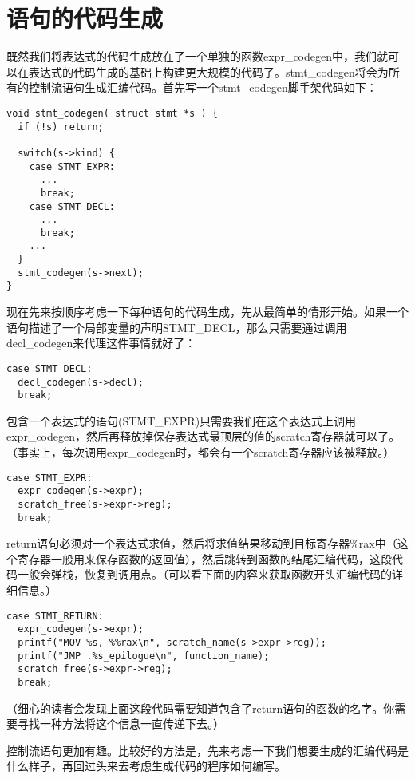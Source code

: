 \documentclass[cn,11pt,chinese]{elegantbook}
\begin{document}
\section{语句的代码生成}

既然我们将表达式的代码生成放在了一个单独的函数expr\_codegen中，我们就可以在表达式的代码生成的基础上构建更大规模的代码了。stmt\_codegen将会为所有的控制流语句生成汇编代码。首先写一个stmt\_codegen脚手架代码如下：

\begin{verbatim}
void stmt_codegen( struct stmt *s ) {
  if (!s) return;
  
  switch(s->kind) {
    case STMT_EXPR:
      ...
      break;
    case STMT_DECL:
      ...
      break;
    ...
  }
  stmt_codegen(s->next);
}
\end{verbatim}

现在先来按顺序考虑一下每种语句的代码生成，先从最简单的情形开始。如果一个语句描述了一个局部变量的声明STMT\_DECL，那么只需要通过调用decl\_codegen来代理这件事情就好了：

\begin{verbatim}
case STMT_DECL:
  decl_codegen(s->decl);
  break;
\end{verbatim}

包含一个表达式的语句(STMT\_EXPR)只需要我们在这个表达式上调用expr\_codegen，然后再释放掉保存表达式最顶层的值的scratch寄存器就可以了。（事实上，每次调用expr\_codegen时，都会有一个scratch寄存器应该被释放。）

\begin{verbatim}
case STMT_EXPR:
  expr_codegen(s->expr);
  scratch_free(s->expr->reg);
  break;
\end{verbatim}

return语句必须对一个表达式求值，然后将求值结果移动到目标寄存器\%rax中（这个寄存器一般用来保存函数的返回值），然后跳转到函数的结尾汇编代码，这段代码一般会弹栈，恢复到调用点。（可以看下面的内容来获取函数开头汇编代码的详细信息。）

\begin{verbatim}
case STMT_RETURN:
  expr_codegen(s->expr);
  printf("MOV %s, %%rax\n", scratch_name(s->expr->reg));
  printf("JMP .%s_epilogue\n", function_name);
  scratch_free(s->expr->reg);
  break;
\end{verbatim}

（细心的读者会发现上面这段代码需要知道包含了return语句的函数的名字。你需要寻找一种方法将这个信息一直传递下去。）

控制流语句更加有趣。比较好的方法是，先来考虑一下我们想要生成的汇编代码是什么样子，再回过头来去考虑生成代码的程序如何编写。
\end{document}
